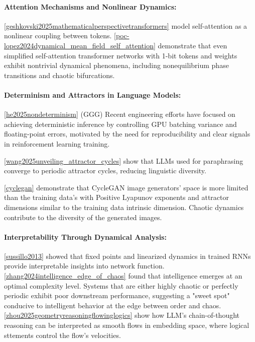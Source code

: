 \documentclass[a4paper,12pt]{article}
\begin{document}
\paragraph{Attention Mechanisms and Nonlinear Dynamics:}
\ref{geshkovski2025mathematicalperspectivetransformers} model self-attention as a nonlinear coupling between tokens.
\ref{poc-lopez2024dynamical_mean_field_self_attention} demonstrate that even simplified self-attention transformer networks with 1-bit tokens and weights exhibit nontrivial dynamical phenomena, including nonequilibrium phase transitions and chaotic bifurcations. 

\paragraph{Determinism and Attractors in Language Models:}
\ref{he2025nondeterminism} (GGG)
Recent engineering efforts have focused on achieving deterministic inference by controlling GPU batching variance and floating-point errors, motivated by the need for reproducibility and clear signals in reinforcement learning training. 

\ref{wang2025unveiling_attractor_cycles} show that LLMs used for paraphrasing converge to periodic attractor cycles, reducing linguistic diversity.

\ref{cyclegan} %
demonstrate that CycleGAN image generators' space is more limited than the training data's with Positive Lyapunov exponents and attractor dimensions similar to the training data intrinsic dimension. Chaotic dynamics contribute to the diversity of the generated images.

\paragraph{Interpretability Through Dynamical Analysis:}
\label{par:interpretability_dynamics}
\ref{sussillo2013} showed that fixed points and linearized dynamics in trained RNNs provide interpretable insights into network function. \ref{zhang2024intelligence_edge_of_chaos} found that intelligence emerges at an optimal complexity level. Systems that are either highly chaotic or perfectly periodic exhibit poor downstream performance, suggesting a "sweet spot" conducive to intelligent behavior at the edge between order and chaos. \ref{zhou2025geometryreasoningflowinglogics} show how LLM's chain-of-thought reasoning can be interpreted as smooth flows in embedding space, where logical sttements control the flow's velocities.
\end{document}
